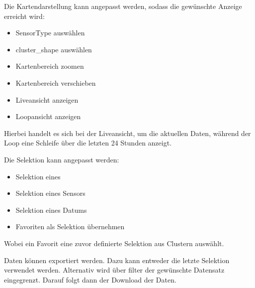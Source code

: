         Die Kartendarstellung kann angepasst werden, sodass die gewünschte Anzeige erreicht wird:
        \begin{itemize}
            \item SensorType auswählen
            \item \gls{cluster_shape} auswählen
            \item Kartenbereich zoomen
            \item Kartenbereich verschieben
            \item Liveansicht anzeigen
            \item Loopansicht anzeigen
        \end{itemize}
        Hierbei handelt es sich bei der Liveansicht, um die aktuellen Daten, während der Loop eine Schleife über die letzten 24 Stunden anzeigt.

        Die Selektion kann angepasst werden:
        \begin{itemize}
            \item Selektion eines 
            \item Selektion eines Sensors
            \item Selektion eines Datums
            \item Favoriten als Selektion übernehmen
        \end{itemize}
        Wobei ein Favorit eine zuvor definierte Selektion aus Clustern auswählt.

        Daten können exportiert werden. Dazu kann entweder die letzte Selektion verwendet werden. Alternativ wird über \gls{filter} der gewünschte Datensatz eingegrenzt. Darauf folgt dann der Download der Daten.